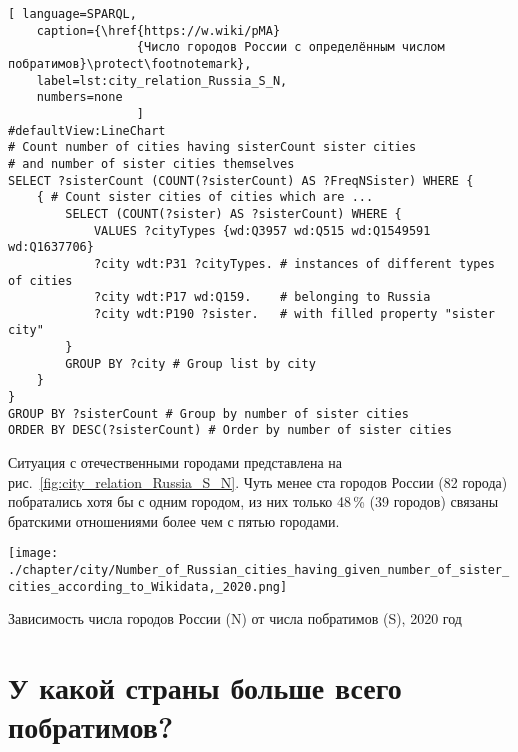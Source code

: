 \begin{lstlisting}[ language=SPARQL, 
    caption={\href{https://w.wiki/pMA}
                  {Число городов России с определённым числом побратимов}\protect\footnotemark},
    label=lst:city_relation_Russia_S_N,
    numbers=none
                  ]
#defaultView:LineChart                                                   
# Count number of cities having sisterCount sister cities  
# and number of sister cities themselves
SELECT ?sisterCount (COUNT(?sisterCount) AS ?FreqNSister) WHERE {                                                                                  
	{ # Count sister cities of cities which are ...
        SELECT (COUNT(?sister) AS ?sisterCount) WHERE {    
            VALUES ?cityTypes {wd:Q3957 wd:Q515 wd:Q1549591 wd:Q1637706}
            ?city wdt:P31 ?cityTypes. # instances of different types of cities
            ?city wdt:P17 wd:Q159.    # belonging to Russia
            ?city wdt:P190 ?sister.   # with filled property "sister city"
		}
		GROUP BY ?city # Group list by city                             
	}
}
GROUP BY ?sisterCount # Group by number of sister cities
ORDER BY DESC(?sisterCount) # Order by number of sister cities                                  
\end{lstlisting}

Ситуация с отечественными городами представлена на рис.~\ref{fig:city_relation_Russia_S_N}. 
Чуть менее ста городов России (82 города) побратались хотя бы с одним городом, 
из них только 48\,\% (39 городов) связаны братскими отношениями более чем с пятью городами.


\begin{marginfigure}[18pt]
    \texttt{[image: ./chapter/city/Number\_of\_Russian\_cities\_having\_given\_number\_of\_sister\_cities\_according\_to\_Wikidata,\_2020.png]}
    \vspace{-18pt}
    \caption[Зависимость числа городов России от числа побратимов, 2020 год.]
            {Зависимость числа городов России (N) от числа побратимов (S), 2020 год}
    \label{fig:city_relation_Russia_S_N}
\end{marginfigure}




\newpage
\section{У какой страны больше всего побратимов?}

